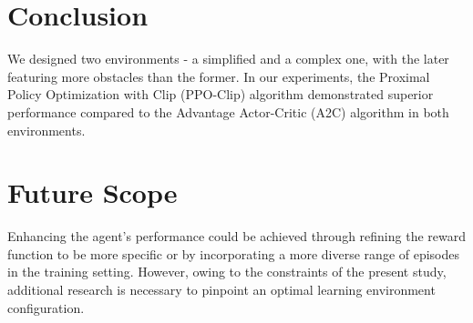 \documentclass[conference]{IEEEtran}
\begin{document}






\section{Conclusion}
We designed two environments - a simplified and a complex one, with the later featuring more obstacles than the former. In our experiments, the Proximal Policy Optimization with Clip (PPO-Clip) algorithm demonstrated superior performance compared to the Advantage Actor-Critic (A2C) algorithm in both environments. 



\section{Future Scope}
Enhancing the agent's performance could be achieved through refining the reward function to be more specific or by incorporating a more diverse range of episodes in the training setting. However, owing to the constraints of the present study, additional research is necessary to pinpoint an optimal learning environment configuration.
\end{document}
